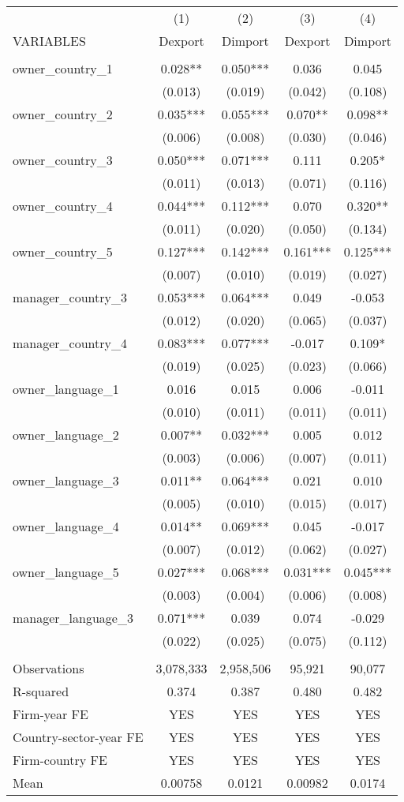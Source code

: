 \begin{tabular}{lcccc} \hline
 & (1) & (2) & (3) & (4) \\
VARIABLES & Dexport & Dimport & Dexport & Dimport \\ \hline
 &  &  &  &  \\
owner\_country\_1 & 0.028** & 0.050*** & 0.036 & 0.045 \\
 & (0.013) & (0.019) & (0.042) & (0.108) \\
owner\_country\_2 & 0.035*** & 0.055*** & 0.070** & 0.098** \\
 & (0.006) & (0.008) & (0.030) & (0.046) \\
owner\_country\_3 & 0.050*** & 0.071*** & 0.111 & 0.205* \\
 & (0.011) & (0.013) & (0.071) & (0.116) \\
owner\_country\_4 & 0.044*** & 0.112*** & 0.070 & 0.320** \\
 & (0.011) & (0.020) & (0.050) & (0.134) \\
owner\_country\_5 & 0.127*** & 0.142*** & 0.161*** & 0.125*** \\
 & (0.007) & (0.010) & (0.019) & (0.027) \\
manager\_country\_3 & 0.053*** & 0.064*** & 0.049 & -0.053 \\
 & (0.012) & (0.020) & (0.065) & (0.037) \\
manager\_country\_4 & 0.083*** & 0.077*** & -0.017 & 0.109* \\
 & (0.019) & (0.025) & (0.023) & (0.066) \\
owner\_language\_1 & 0.016 & 0.015 & 0.006 & -0.011 \\
 & (0.010) & (0.011) & (0.011) & (0.011) \\
owner\_language\_2 & 0.007** & 0.032*** & 0.005 & 0.012 \\
 & (0.003) & (0.006) & (0.007) & (0.011) \\
owner\_language\_3 & 0.011** & 0.064*** & 0.021 & 0.010 \\
 & (0.005) & (0.010) & (0.015) & (0.017) \\
owner\_language\_4 & 0.014** & 0.069*** & 0.045 & -0.017 \\
 & (0.007) & (0.012) & (0.062) & (0.027) \\
owner\_language\_5 & 0.027*** & 0.068*** & 0.031*** & 0.045*** \\
 & (0.003) & (0.004) & (0.006) & (0.008) \\
manager\_language\_3 & 0.071*** & 0.039 & 0.074 & -0.029 \\
 & (0.022) & (0.025) & (0.075) & (0.112) \\
 &  &  &  &  \\
Observations & 3,078,333 & 2,958,506 & 95,921 & 90,077 \\
R-squared & 0.374 & 0.387 & 0.480 & 0.482 \\
Firm-year FE & YES & YES & YES & YES \\
Country-sector-year FE & YES & YES & YES & YES \\
Firm-country FE & YES & YES & YES & YES \\
 Mean & 0.00758 & 0.0121 & 0.00982 & 0.0174 \\ \hline
\end{tabular}
